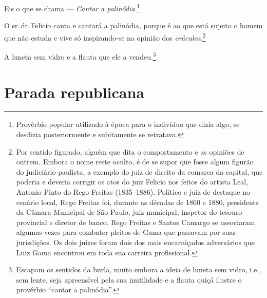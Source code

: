 Eis o que se chama --- \emph{Cantar a palinódia}.\footnote{ Provérbio
  popular utilizado à época para o indivíduo que dizia algo, se desdizia
  posteriormente e subitamente se retratava.}

O sr.\,dr.\,Felicio canta e cantará a palinódia, porque é ao que está
sujeito o homem que não estuda e vive só inspirando-se na opinião dos
\emph{oráculos}.\footnote{ Por sentido figurado, alguém que dita o
  comportamento e as opiniões de outrem. Embora o nome reste oculto, é
  de se supor que fosse algum figurão do judiciário paulista, a exemplo
  do juiz de direito da comarca da capital, que poderia e deveria
  corrigir os atos do juiz Felicio nos feitos do artista Leal, Antonio
  Pinto do Rego Freitas (1835--1886). Político e juiz de destaque no
  cenário local, Rego Freitas foi, durante as décadas de 1860 e 1880,
  presidente da Câmara Municipal de São Paulo, juiz municipal, inspetor
  do tesouro provincial e diretor de banco. Rego Freitas e Santos
  Camargo se associaram algumas vezes para combater pleitos de Gama que
  passavam por suas jurisdições. Os dois juízes foram dois dos mais
  encarniçados adversários que Luiz Gama encontrou em toda sua carreira
  profissional.}

A luneta sem vidro e a flauta que ele a vendeu.\footnote{ Escapam os
  sentidos da burla, muito embora a ideia de luneta sem vidro, i.e., sem
  lente, seja apreensível pela sua inutilidade e a flauta quiçá ilustre
  o provérbio ``cantar a palinódia''.}

\part{Parada republicana}

